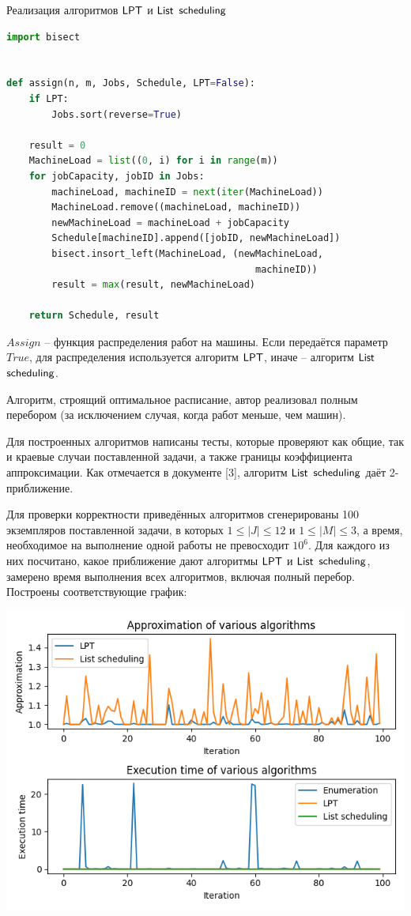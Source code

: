 \begin{algorithm}
\caption{Реализация алгоритмов $\sf{LPT}$ и $\sf{List}$ $\sf{scheduling}$}\label{alg:cap}
\begin{lstlisting}[language=Python]
import bisect


def assign(n, m, Jobs, Schedule, LPT=False):
    if LPT:
        Jobs.sort(reverse=True)

    result = 0
    MachineLoad = list((0, i) for i in range(m))
    for jobCapacity, jobID in Jobs:
        machineLoad, machineID = next(iter(MachineLoad))
        MachineLoad.remove((machineLoad, machineID))
        newMachineLoad = machineLoad + jobCapacity
        Schedule[machineID].append([jobID, newMachineLoad])
        bisect.insort_left(MachineLoad, (newMachineLoad, 
                                            machineID))
        result = max(result, newMachineLoad)

    return Schedule, result
\end{lstlisting}
\end{algorithm}
$Assign$ -- функция распределения работ на машины. Если передаётся параметр $True$, для распределения используется алгоритм $\sf{LPT}$, иначе -- алгоритм $\sf{List}$ $\sf{scheduling}$.

Алгоритм, строящий оптимальное расписание, автор реализовал полным перебором (за исключением случая, когда работ меньше, чем машин).

Для построенных алгоритмов написаны тесты, которые проверяют как общие, так и краевые случаи поставленной задачи, а также границы коэффициента аппроксимации. Как отмечается в документе [3], алгоритм $\sf{List}$ $\sf{scheduling}$ даёт 2-приближение.

Для проверки корректности приведённых алгоритмов сгенерированы 100 экземпляров поставленной задачи, в которых $1 \leq |J| \leq 12$ и $1 \leq |M| \leq 3$, а время, необходимое на выполнение одной работы не превосходит $10^6$. Для каждого из них посчитано, какое приближение дают алгоритмы $\sf{LPT}$ и $\sf{List}$ $\sf{scheduling}$, замерено время выполнения всех алгоритмов, включая полный перебор. Построены соответствующие график:

\begin{center}
\includegraphics[scale = 0.7]{img/myplot.png}
\end{center}

